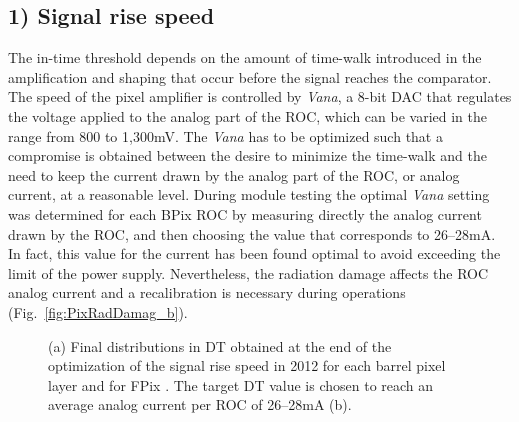 \subsection*{1) Signal rise speed}

The in-time threshold depends on the amount of time-walk introduced in the amplification and shaping that occur before the signal reaches the comparator.
The speed of the pixel amplifier is controlled by \textit{Vana}, a 8-bit DAC that regulates the voltage applied to the analog part of the ROC, which can be varied in the range from 800 to 1,300\unit{mV}.
The \textit{Vana} has to be optimized such that a compromise is obtained between the desire to minimize the time-walk and the need to keep the current drawn by the analog part of the ROC, or analog current, at a reasonable level.
During module testing the optimal \textit{Vana} setting was determined for each BPix ROC by measuring directly the analog current drawn by the ROC, and then choosing the value that corresponds to 26--28\unit{mA}.
In fact, this value for the current has been found optimal to avoid exceeding the limit of the power supply.
Nevertheless, the radiation damage affects the ROC analog current and a recalibration is necessary during operations (Fig.~\ref{fig:PixRadDamag_b}). 

\begin{figure}[!htb]
 \begin{center}
 \end{center}
 \caption{(a) Final distributions in DT obtained at the end of the optimization of the signal rise speed in 2012 for each barrel pixel layer and for FPix . The target DT value is chosen to reach an average analog current per ROC of 26--28\unit{mA} (b).}
 \label{fig:VanaCalib2012}
\end{figure}

